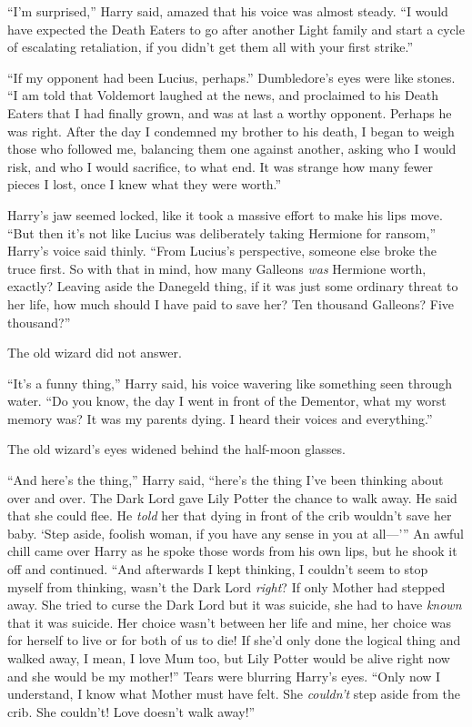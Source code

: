 “I’m surprised,” Harry said, amazed that his voice was almost steady.
“I would have expected the Death Eaters to go after another Light family and start a cycle of escalating retaliation, if you didn’t get them all with your first strike.”

“If my opponent had been Lucius, perhaps.” Dumbledore’s eyes were like stones.
“I am told that Voldemort laughed at the news, and proclaimed to his Death Eaters that I had finally grown, and was at last a worthy opponent. Perhaps he was right. After the day I condemned my brother to his death, I began to weigh those who followed me, balancing them one against another, asking who I would risk, and who I would sacrifice, to what end. It was strange how many fewer pieces I lost, once I knew what they were worth.”

Harry’s jaw seemed locked, like it took a massive effort to make his lips move.
“But then it’s not like Lucius was deliberately taking Hermione for ransom,” Harry’s voice said thinly.
“From Lucius’s perspective, someone else broke the truce first. So with that in mind, how many Galleons \emph{was} Hermione worth, exactly? Leaving aside the Danegeld thing, if it was just some ordinary threat to her life, how much should I have paid to save her? Ten thousand Galleons? Five thousand?”

The old wizard did not answer.

“It’s a funny thing,” Harry said, his voice wavering like something seen through water.
“Do you know, the day I went in front of the Dementor, what my worst memory was? It was my parents dying. I heard their voices and everything.”

The old wizard’s eyes widened behind the half-moon glasses.

“And here’s the thing,” Harry said, “here’s the thing I’ve been thinking about over and over. The Dark Lord gave Lily Potter the chance to walk away. He said that she could flee. He \emph{told} her that dying in front of the crib wouldn’t save her baby. ‘Step aside, foolish woman, if you have any sense in you at all—’{}” An awful chill came over Harry as he spoke those words from his own lips, but he shook it off and continued.
“And afterwards I kept thinking, I couldn’t seem to stop myself from thinking, wasn’t the Dark Lord \emph{right}? If only Mother had stepped away. She tried to curse the Dark Lord but it was suicide, she had to have \emph{known} that it was suicide. Her choice wasn’t between her life and mine, her choice was for herself to live or for both of us to die! If she’d only done the logical thing and walked away, I mean, I love Mum too, but Lily Potter would be alive right now and she would be my mother!” Tears were blurring Harry’s eyes.
“Only now I understand, I know what Mother must have felt. She \emph{couldn’t} step aside from the crib. She couldn’t! Love doesn’t walk away!”

